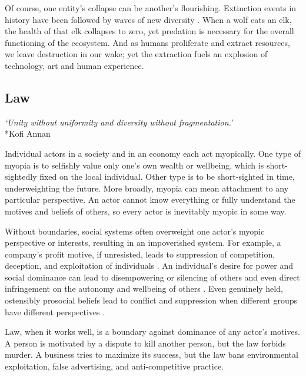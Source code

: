 \documentclass[12pt]{article}
\begin{document}
Of course, one entity's collapse can be another's flourishing. Extinction events in history have been followed by waves of new diversity \citep{feng2017phylogenomics, jablonski2005mass, raup1994role}. When a wolf eats an elk, the health of that elk collapses to zero, yet predation is necessary for the overall functioning of the ecosystem. And as humans proliferate and extract resources, we leave destruction in our wake; yet the extraction fuels an explosion of technology, art and human experience.



\subsection{Law}

\begin{center}
\textit{`Unity without uniformity and diversity without fragmentation.'}\\*Kofi Annan
\end{center}

Individual actors in a society and in an economy each act myopically. One type of myopia is to selfishly value only one's own wealth or wellbeing, which is short-sightedly fixed on the local individual. Other type is to be short-sighted in time, underweighting the future. More broadly, myopia can mean attachment to any particular perspective. An actor cannot know everything or fully understand the motives and beliefs of others, so every actor is inevitably myopic in some way. 


Without boundaries, social systems often overweight one actor's myopic perspective or interests, resulting in an impoverished system. For example, a company's profit motive, if unresisted, leads to suppression of competition, deception, and exploitation of individuals \citep{dalrymple2019anarchy, baran1966monopoly, goldacre2014bad, smith1776inquiry, bakan2006corporation}. An individual's desire for power and social dominance can lead to disempowering or silencing of others and even direct infringement on the autonomy and wellbeing of others \citep{hawley2003prosocial, tepper2000consequences, sidanius2001social}. Even genuinely held, ostensibly prosocial beliefs lead to conflict and suppression when different groups have different perspectives \citep{haidt2012righteous, scott1998seeing, greene2013moral}.

Law, when it works well, is a boundary against dominance of any actor's motives. A person is motivated by a dispute to kill another person, but the law forbids murder. A business tries to maximize its success, but the law bans environmental exploitation, false advertising, and anti-competitive practice. 
\end{document}
